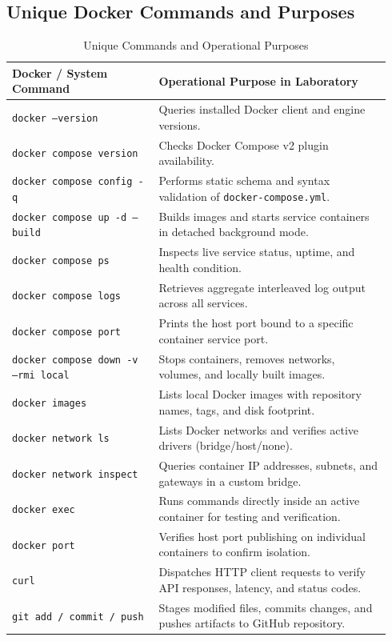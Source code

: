 \documentclass[10pt,a4paper]{article}
\begin{document}
\subsection{Unique Docker Commands and Purposes}

\begin{table}[H]
\centering
\scriptsize
\begin{tabular}{p{0.36\linewidth} p{0.58\linewidth}}
\toprule
\textbf{Docker / System Command} & \textbf{Operational Purpose in Laboratory} \\
\midrule
\texttt{docker --version} & Queries installed Docker client and engine versions. \\
\texttt{docker compose version} & Checks Docker Compose v2 plugin availability. \\
\texttt{docker compose config -q} & Performs static schema and syntax validation of \texttt{docker-compose.yml}. \\
\texttt{docker compose up -d --build} & Builds images and starts service containers in detached background mode. \\
\texttt{docker compose ps} & Inspects live service status, uptime, and health condition. \\
\texttt{docker compose logs} & Retrieves aggregate interleaved log output across all services. \\
\texttt{docker compose port} & Prints the host port bound to a specific container service port. \\
\texttt{docker compose down -v --rmi local} & Stops containers, removes networks, volumes, and locally built images. \\
\texttt{docker images} & Lists local Docker images with repository names, tags, and disk footprint. \\
\texttt{docker network ls} & Lists Docker networks and verifies active drivers (bridge/host/none). \\
\texttt{docker network inspect} & Queries container IP addresses, subnets, and gateways in a custom bridge. \\
\texttt{docker exec} & Runs commands directly inside an active container for testing and verification. \\
\texttt{docker port} & Verifies host port publishing on individual containers to confirm isolation. \\
\texttt{curl} & Dispatches HTTP client requests to verify API responses, latency, and status codes. \\
\texttt{git add / commit / push} & Stages modified files, commits changes, and pushes artifacts to GitHub repository. \\
\bottomrule
\end{tabular}
\caption{Unique Commands and Operational Purposes}
\end{table}
\end{document}
